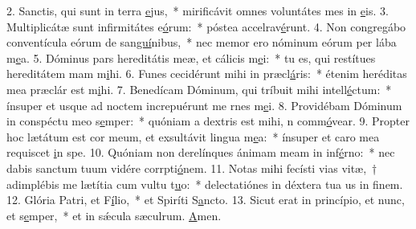 2. Sanctis, qui sunt in terra \uline{e}jus,~* mirificávit omnes voluntátes mes in \uline{e}is.
3. Multiplicátæ sunt infirmitátes e\uline{ó}rum:~* póstea accelrav\uline{é}runt.
4. Non congregábo conventícula eórum de san\uline{guí}nibus,~* nec memor ero nóminum eórum per lába m\uline{e}a.
5. Dóminus pars hereditátis meæ, et cálicis m\uline{e}i:~* tu es, qui restítues hereditátem mam m\uline{i}hi.
6. Funes cecidérunt mihi in præcl\uline{á}ris:~* étenim heréditas mea præclár est m\uline{i}hi.
7. Benedícam Dóminum, qui tríbuit mihi intell\uline{é}ctum:~* ínsuper et usque ad noctem increpuérunt me rnes m\uline{e}i.
8. Providébam Dóminum in conspéctu meo s\uline{e}mper:~* quóniam a dextris est mihi, n comm\uline{ó}vear.
9. Propter hoc lætátum est cor meum, et exsultávit lingua m\uline{e}a:~* ínsuper et caro mea requiscet \uline{i}n spe.
10. Quóniam non derelínques ánimam meam in inf\uline{é}rno:~* nec dabis sanctum tuum vidére corrpti\uline{ó}nem.
11. Notas mihi fecísti vias vitæ,~† adimplébis me lætítia cum vultu t\uline{u}o:~* delectatiónes in déxtera tua us in f\uline{i}nem.
12. Glória Patri, et F\uline{í}lio,~* et Spiríti S\uline{a}ncto.
13. Sicut erat in princípio, et nunc, et s\uline{e}mper,~* et in sǽcula sæculrum. \uline{A}men.
